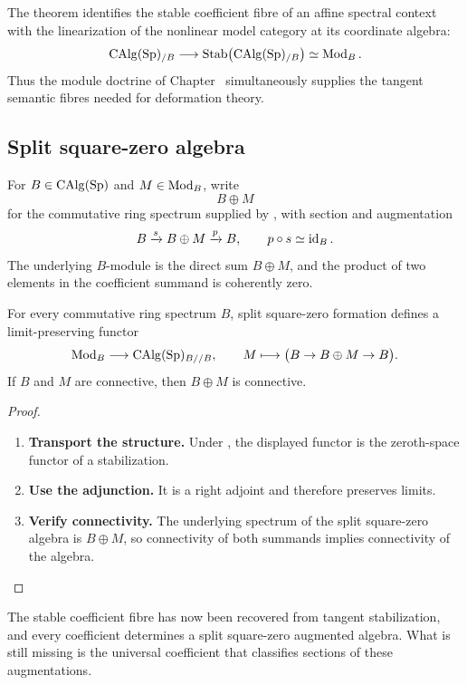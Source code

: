 \begin{remark}
\label{rem:linear-semantics-at-model}
The theorem identifies the stable coefficient fibre of an affine spectral
context with the linearization of the nonlinear model category at its
coordinate algebra:
\[
    \operatorname{CAlg}(\operatorname{Sp})_{/B}
    \longrightarrow
    \operatorname{Stab}\bigl(\operatorname{CAlg}(\operatorname{Sp})_{/B}\bigr)
    \simeq
    \operatorname{Mod}_B.
\]
Thus the module doctrine of Chapter~
simultaneously supplies the tangent semantic fibres needed for deformation
theory.
\end{remark}

\subsection{Split square-zero algebra}

\begin{construction}
\label{con:split-square-zero-algebra}
For \(B\in\operatorname{CAlg}(\operatorname{Sp})\) and \(M\in\operatorname{Mod}_B\), write
\[
    B\oplus M
\]
for the commutative ring spectrum supplied by
, with section and augmentation
\[
    B
    \xrightarrow{s}
    B\oplus M
    \xrightarrow{p}
    B,
    \qquad
    p\circ s\simeq\operatorname{id}_B.
\]
The underlying \(B\)-module is the direct sum \(B\oplus M\), and the product
of two elements in the coefficient summand is coherently zero.
\end{construction}

\begin{proposition}
\label{prop:split-square-zero-functoriality}
For every commutative ring spectrum \(B\), split square-zero formation defines
a limit-preserving functor
\[
    \operatorname{Mod}_B
    \longrightarrow
    \operatorname{CAlg}(\operatorname{Sp})_{B//B},
    \qquad
    M\longmapsto
    \bigl(B\to B\oplus M\to B\bigr).
\]
If \(B\) and \(M\) are connective, then \(B\oplus M\) is connective.
\end{proposition}

\begin{proof}
\leavevmode
\begin{enumerate}[label=\textup{(\arabic*)}]
    \item \textbf{Transport the structure.}
    Under , the displayed functor is the zeroth-space functor of
    a stabilization.

    \item \textbf{Use the adjunction.}
    It is a right adjoint and therefore preserves limits.

    \item \textbf{Verify connectivity.}
    The underlying spectrum of the split square-zero algebra is \(B\oplus M\), so connectivity of
    both summands implies connectivity of the algebra.
\end{enumerate}
\end{proof}
The stable coefficient fibre has now been recovered from tangent
stabilization, and every coefficient determines a split square-zero augmented
algebra. What is still missing is the universal coefficient that classifies
sections of these augmentations.

